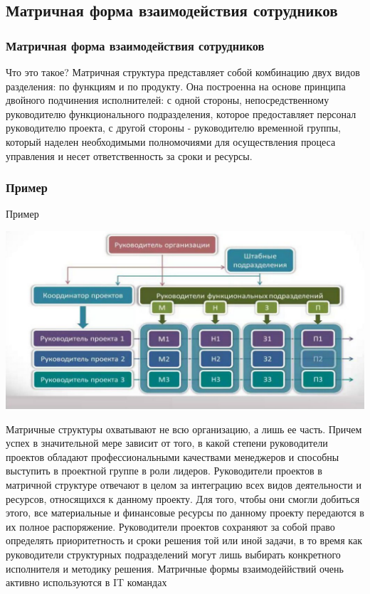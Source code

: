 \documentclass{industrial-development}
\begin{document}
\subsection{Матричная форма взаимодействия сотрудников}

\begin{frame} \frametitle{Матричная форма взаимодействия сотрудников}
  \begin{block}{Что это такое?}
Матричная структура представляет собой комбинацию двух видов разделения: по функциям и по продукту. Она построенна на основе принципа двойного подчинения исполнителей: с одной стороны, непосредственному руководителю функционального подразделения, которое предоставляет персонал руководителю проекта, с другой стороны  - руководителю временной группы, который наделен необходимыми полномочиями для осуществления процеса управления и несет ответственность за сроки и ресурсы.
  \end{block}
\end{frame}

\begin{frame} \frametitle{Пример}
  \begin{block}{Пример}
\centerline{\includegraphics[width=1\textwidth]{matrix.pdf}}
  \end{block}
\end{frame}

\lecturenotes
Матричные структуры охватывают не всю организацию, а лишь ее часть. Причем успех в значительной мере зависит от того, в какой степени руководители проектов обладают профессиональными качествами менеджеров и способны выступить в проектной группе в роли лидеров.
Руководители проектов в матричной структуре отвечают в целом за интеграцию всех видов деятельности и ресурсов, относящихся к данному проекту. Для того, чтобы они смогли добиться этого, все материальные и финансовые ресурсы по данному проекту передаются в их полное распоряжение. Руководители проектов сохраняют за собой право определять приоритетность и сроки решения той или иной задачи, в то время как руководители структурных подразделений могут лишь выбирать конкретного исполнителя и методику решения.
Матричные формы взаимодеййствий очень активно используются в IT  командах
\end{document}
